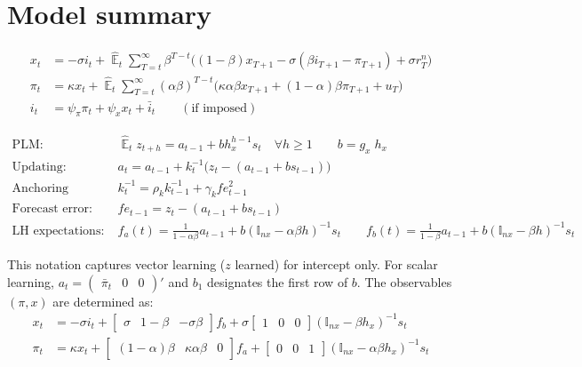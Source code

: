 \documentclass[11pt]{article}
\renewcommand{\[}{\begin{equation}}
\renewcommand{\]}{\end{equation}}
\DeclareMathOperator{\E}{\mathbb{E}}
\begin{document}
\section{Model summary}

\vspace{-0.5cm}

\begin{align}
x_t &=  -\sigma i_t +\hat{\E}_t \sum_{T=t}^{\infty} \beta^{T-t }\big( (1-\beta)x_{T+1} - \sigma(\beta i_{T+1} - \pi_{T+1}) +\sigma r_T^n \big)  \label{A1}  \\
\pi_t &= \kappa x_t +\hat{\E}_t \sum_{T=t}^{\infty} (\alpha\beta)^{T-t }\big( \kappa \alpha \beta x_{T+1} + (1-\alpha)\beta \pi_{T+1} + u_T\big) \label{A2}  \\
i_t &= \psi_{\pi}\pi_t + \psi_{x} x_t  + \bar{i}_t \label{TR} \quad \quad (\text{if imposed})
\end{align}

\vspace{-1.2cm}

\begin{align}
\text{PLM:} \quad \quad & \hat{\E}_t z_{t+h}  =  a_{t-1} + bh_x^{h-1}s_t  \quad \forall h\geq 1 \quad \quad b = g_x\; h_x \quad \quad  \label{PLM} \\
\text{Updating:} \quad \quad & a_{t}  =a_{t-1} +k_t^{-1}\big(z_{t} -(a_{t-1}+b s_{t-1}) \big)  \label{A5} \\
\text{Anchoring function:} \quad \quad & k^{-1}_t  = \rho_k k^{-1}_{t-1} + \gamma_k fe_{t-1}^2 \label{A6}\\
\text{Forecast error:} \quad \quad & fe_{t-1}  = z_t - (a_{t-1}+b s_{t-1}) \label{A7} \\
\text{LH expectations:} \quad \quad & f_a(t) = \frac{1}{1-\alpha\beta}a_{t-1}  + b(\mathbb{I}_{nx} - \alpha\beta h)^{-1}s_t \quad \quad  f_b(t) = \frac{1}{1-\beta}a_{t-1}  + b(\mathbb{I}_{nx} - \beta h)^{-1}s_t  \label{A8}
\end{align}

\vspace{-0.5cm}

This notation captures vector learning ($z$ learned) for intercept only. For scalar learning, $a_t= \begin{pmatrix} \bar{\pi}_t & 0 & 0\end{pmatrix}' $ and $b_1$ designates the first row of $b$. The observables $(\pi, x)$ are determined as:
\begin{align}
x_t &=  -\sigma i_t + \begin{bmatrix} \sigma & 1-\beta & -\sigma\beta \end{bmatrix} f_b + \sigma \begin{bmatrix} 1 & 0 & 0 \end{bmatrix} (\mathbb{I}_{nx} - \beta h_x)^{-1} s_t \label{A9} \\
\pi_t &= \kappa x_t  + \begin{bmatrix} (1-\alpha)\beta & \kappa\alpha\beta & 0 \end{bmatrix}  f_a + \begin{bmatrix} 0 & 0 & 1 \end{bmatrix}  (\mathbb{I}_{nx} - \alpha \beta h_x)^{-1}  s_t \label{A10}
\end{align}
\end{document}
